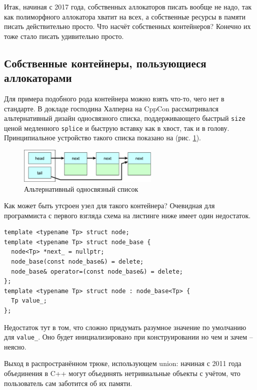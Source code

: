 \documentclass[a4paper,12pt,oneside]{book}
\begin{document}
Итак, начиная с 2017 года, собственных аллокаторов писать вообще не надо, так как полиморфного аллокатора хватит на всех, а собственные ресурсы в памяти писать действительно просто. Что насчёт собственных контейнеров? Конечно их тоже стало писать удивительно просто.

\subsection{Собственные контейнеры, пользующиеся аллокаторами}\label{sub:polycont}

Для примера подобного рода контейнера можно взять что-то, чего нет в стандарте. В докладе господина Халперна на CppCon \cite{talk:halpern:allocators} рассматривался альтернативный дизайн односвязного списка, поддерживающего быстрый \lstinline!size! ценой медленного \lstinline!splice! и быструю вставку как в хвост, так и в голову. Принципиальное устройство такого списка показано на (рис. \ref{fig:slist}). 

\begin{figure}[ht]
\centering
\includegraphics[width=0.6\textwidth]{illustrations/slist-crop.pdf}
\caption{Альтернативный односвязный список}
\label{fig:slist}
\end{figure}

Как может быть утсроен узел для такого контейнера? Очевидная для программиста с первого взгляда схема на листинге ниже имеет один недостаток.

\begin{lstlisting}
template <typename Tp> struct node;
template <typename Tp> struct node_base {
  node<Tp> *next_ = nullptr;
  node_base(const node_base&) = delete;
  node_base& operator=(const node_base&) = delete;
};
template <typename Tp> struct node : node_base<Tp> {
  Tp value_;
};
\end{lstlisting}

Недостаток тут в том, что сложно придумать разумное значение по умолчанию для \lstinline!value_!. Оно будет инициализировано при конструировании но чем и зачем -- неясно.

Выход в распространённом трюке, использующем union: начиная с 2011 года объединения в C++ могут объединять нетривиальные объекты с учётом, что пользователь сам заботится об их памяти.
\end{document}
